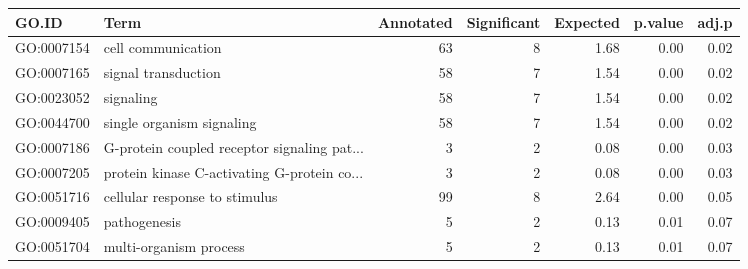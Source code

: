 \begin{table}[ht]
\centering
\begin{tabular}{llrrrrr}
  \hline
GO.ID & Term & Annotated & Significant & Expected & p.value & adj.p \\ 
  \hline
GO:0007154 & cell communication &  63 &   8 & 1.68 & 0.00 & 0.02 \\ 
  GO:0007165 & signal transduction &  58 &   7 & 1.54 & 0.00 & 0.02 \\ 
  GO:0023052 & signaling &  58 &   7 & 1.54 & 0.00 & 0.02 \\ 
  GO:0044700 & single organism signaling &  58 &   7 & 1.54 & 0.00 & 0.02 \\ 
  GO:0007186 & G-protein coupled receptor signaling pat... &   3 &   2 & 0.08 & 0.00 & 0.03 \\ 
  GO:0007205 & protein kinase C-activating G-protein co... &   3 &   2 & 0.08 & 0.00 & 0.03 \\ 
  GO:0051716 & cellular response to stimulus &  99 &   8 & 2.64 & 0.00 & 0.05 \\ 
  GO:0009405 & pathogenesis &   5 &   2 & 0.13 & 0.01 & 0.07 \\ 
  GO:0051704 & multi-organism process &   5 &   2 & 0.13 & 0.01 & 0.07 \\ 
   \hline
\end{tabular}
\end{table}
